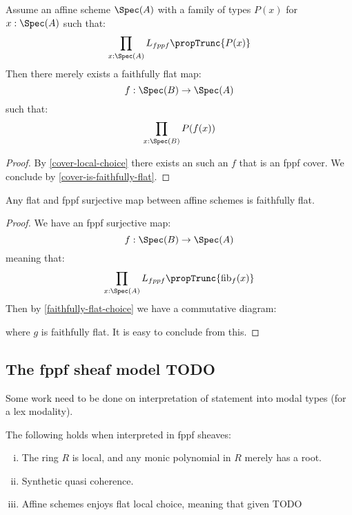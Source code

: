 \begin{lemma}\label{faithfully-flat-choice}
Assume an affine scheme $\Spec(A)$ with a family of types $P(x)$ for $x:\Spec(A)$ such that:
\[\prod_{x:\Spec(A)}L_{fppf}\propTrunc{P(x)}\]
Then there merely exists a faithfully flat map:
\[f:\Spec(B)\to\Spec(A)\]
such that:
\[\prod_{x:\Spec(B)}P(f(x))\]
\end{lemma}

\begin{proof}
By \cref{cover-local-choice} there exists an such an $f$ that is an fppf cover. We conclude by \cref{cover-is-faithfully-flat}.
\end{proof}

\begin{proposition}
Any flat and fppf surjective map between affine schemes is faithfully flat.
\end{proposition}

\begin{proof}
We have an fppf surjective map:
\[f:\Spec(B)\to \Spec(A)\]
meaning that:
\[\prod_{x:\Spec(A)}L_{fppf}\propTrunc{\mathrm{fib}_f(x)}\]
Then by \cref{faithfully-flat-choice} we have a commutative diagram:
 \begin{center}
    \end{center}
where $g$ is faithfully flat. It is easy to conclude from this.
\end{proof}

\subsection{The fppf sheaf model TODO}

Some work need to be done on interpretation of statement into modal types (for a lex modality).

\begin{theorem}
The following holds when interpreted in fppf sheaves:
\begin{enumerate}[(i)]
\item The ring $R$ is local, and any monic polynomial in $R$ merely has a root.
\item Synthetic quasi coherence.
\item Affine schemes enjoys flat local choice, meaning that given TODO
\end{enumerate}
\end{theorem}

